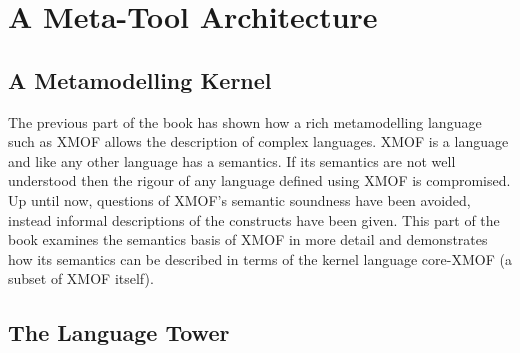 \chapter{A Meta-Tool Architecture}
\label{kernelchapter}

\section{A Metamodelling Kernel}

The previous part of the book has shown how a rich metamodelling language such as XMOF allows the description of complex languages.  XMOF is a language and like any other language has a semantics.  If its semantics are not well understood then the rigour of any language defined using XMOF is compromised.  Up until now, questions of XMOF's semantic soundness have been avoided, instead informal descriptions of the constructs have been given.  This part of the book examines the semantics basis of XMOF in more detail and demonstrates how its semantics can be described in terms of the kernel language core-XMOF (a subset of XMOF itself).



\section{The Language Tower}

